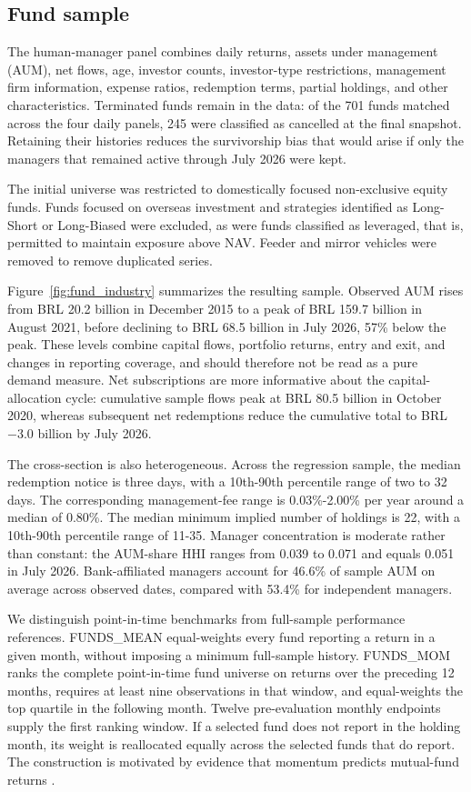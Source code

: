\documentclass[preprint,12pt,authoryear]{elsarticle}
\begin{document}
\subsection{Fund sample}

The human-manager panel combines daily returns, assets under management (AUM), net flows, age, investor counts, investor-type restrictions, management firm information, expense ratios, redemption terms, partial holdings, and other characteristics. Terminated funds remain in the data: of the 701 funds matched across the four daily panels, 245 were classified as cancelled at the final snapshot. Retaining their histories reduces the survivorship bias that would arise if only the managers that remained active through July 2026 were kept.

The initial universe was restricted to domestically focused non-exclusive equity funds. Funds focused on overseas investment and strategies identified as Long-Short or Long-Biased were excluded, as were funds classified as leveraged, that is, permitted to maintain exposure above NAV. Feeder and mirror vehicles were removed to remove duplicated series.

Figure~\ref{fig:fund_industry} summarizes the resulting sample. Observed AUM rises from BRL 20.2 billion in December 2015 to a peak of BRL 159.7 billion in August 2021, before declining to BRL 68.5 billion in July 2026, 57\% below the peak. These levels combine capital flows, portfolio returns, entry and exit, and changes in reporting coverage, and should therefore not be read as a pure demand measure. Net subscriptions are more informative about the capital-allocation cycle: cumulative sample flows peak at BRL 80.5 billion in October 2020, whereas subsequent net redemptions reduce the cumulative total to BRL $-3.0$ billion by July 2026.

The cross-section is also heterogeneous. Across the regression sample, the median redemption notice is three days, with a 10th-90th percentile range of two to 32 days. The corresponding management-fee range is 0.03\%-2.00\% per year around a median of 0.80\%. The median minimum implied number of holdings is 22, with a 10th-90th percentile range of 11-35. Manager concentration is moderate rather than constant: the AUM-share HHI ranges from 0.039 to 0.071 and equals 0.051 in July 2026. Bank-affiliated managers account for 46.6\% of sample AUM on average across observed dates, compared with 53.4\% for independent managers.

We distinguish point-in-time benchmarks from full-sample performance references. FUNDS\_MEAN equal-weights every fund reporting a return in a given month, without imposing a minimum full-sample history. FUNDS\_MOM ranks the complete point-in-time fund universe on returns over the preceding 12 months, requires at least nine observations in that window, and equal-weights the top quartile in the following month. Twelve pre-evaluation monthly endpoints supply the first ranking window. If a selected fund does not report in the holding month, its weight is reallocated equally across the selected funds that do report. The construction is motivated by evidence that momentum predicts mutual-fund returns \citep{demiguel2023machine, kaniel2023machine, cuthbertsonnitzscheosullivan2022}.
\end{document}
